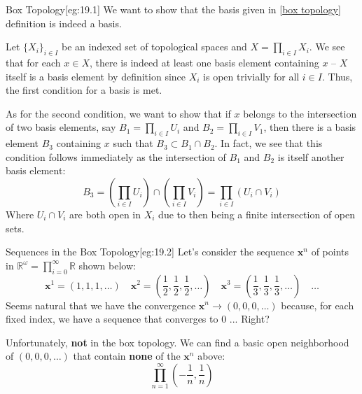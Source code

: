 \begin{egBox}{Box Topology}[eg:19.1]
    We want to show that the basis given in [\hyperlink{box_top}{box topology}]
    definition is indeed a basis.

    \baseSkip

    Let \( \{ X_{ i } \}_{ i \in I } \) be an indexed set of topological spaces
    and \( X = \prod_{ i \in I } X_{ i } \).
    We see that for each \( x \in X \), there is indeed at least one basis 
    element containing \( x \) -- \( X \) itself is a basis element by 
    definition since \( X_{ i } \) is open trivially for all \( i \in I \).
    Thus, the first condition for a basis is met.

    \baseSkip 

    As for the second condition, we want to show that if \( x \) belongs to the
    intersection of two basis elements, say \( B_{ 1 } = \prod_{ i \in I }
    U_{ i } \) and \( B_{ 2 } = \prod_{ i \in I } V_{ 1 } \), then there is a
    basis element \( B_{ 3 } \) containing \( x \) such that 
    \( B_{ 3 } \subset B_{ 1 } \cap B_{ 2 } \).
    In fact, we see that this condition follows immediately as the intersection
    of \( B_{ 1 } \) and \( B_{ 2 } \) is itself another basis element:
    \begin{equation*}
        B_{ 3 }
        =
        \left( \prod_{ i \in I } U_{ i } \right)
        \cap 
        \left( \prod_{ i \in I } V_{ i } \right)
        =
        \prod_{ i \in I } ( U_{ i } \cap V_{ i } )
    \end{equation*}
    Where \( U_{ i } \cap V_{ i } \) are both open in \( X_{ i } \) due to 
    then being a finite intersection of open sets.
\end{egBox}

\begin{egBox}{Sequences in the Box Topology}[eg:19.2]
    Let's consider the sequence \( \mathbf{x}^{ n } \) of points in
    \( \mathbb{R}^{ \omega } = \prod_{ i = 0 }^{ \infty } \mathbb{R} \) shown
    below:
    \begin{equation*}
        \mathbf{x}^{ 1 }
        =
        ( 1, 1, 1, \ldots )
        \quad
        \mathbf{x}^{ 2 }
        =
        \left( \frac{ 1 }{ 2 }, \frac{ 1 }{ 2 }, \frac{ 1 }{ 2 }, \ldots \right)
        \quad
        \mathbf{x}^{ 3 }
        =
        \left( \frac{ 1 }{ 3 }, \frac{ 1 }{ 3 }, \frac{ 1 }{ 3 }, \ldots \right)
        \quad
        \ldots
    \end{equation*}
    Seems natural that we have the convergence \( \mathbf{x}^{ n } \rightarrow
    ( 0, 0, 0, \ldots ) \) because, for each fixed index, we have a sequence 
    that converges to \( 0 \) ... Right?

    \baseSkip

    Unfortunately, \textbf{not} in the box topology.
    We can find a basic open neighborhood of \( ( 0, 0, 0, \ldots ) \) that 
    contain \textbf{none} of the \( \mathbf{x}^{ n } \) above:
    \begin{equation*}
        \prod_{ n = 1 }^{ \infty } 
        \left( - \frac{ 1 }{ n }, \frac{ 1 }{ n } \right)
    \end{equation*}
\end{egBox}

